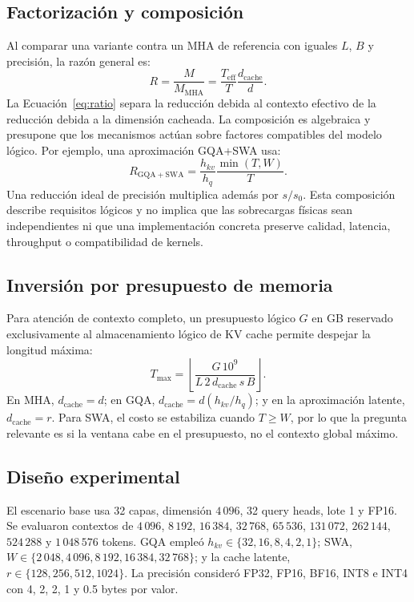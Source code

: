 \documentclass[a4paper,twocolumn]{article}
\begin{document}
\subsection{Factorización y composición}
Al comparar una variante contra un MHA de referencia con iguales $L$, $B$ y precisión, la razón general es:
\begin{equation}\label{eq:ratio}
R=\frac{M}{M_{\mathrm{MHA}}}=\frac{T_{\mathrm{eff}}}{T}\frac{d_{\mathrm{cache}}}{d}.
\end{equation}
La Ecuación~\eqref{eq:ratio} separa la reducción debida al contexto efectivo de la reducción debida a la dimensión cacheada. La composición es algebraica y presupone que los mecanismos actúan sobre factores compatibles del modelo lógico. Por ejemplo, una aproximación GQA+SWA usa:
\begin{equation}\label{eq:compose}
R_{\mathrm{GQA+SWA}}=\frac{h_{kv}}{h_q}\frac{\min(T,W)}{T}.
\end{equation}
Una reducción ideal de precisión multiplica además por $s/s_0$. Esta composición describe requisitos lógicos y no implica que las sobrecargas físicas sean independientes ni que una implementación concreta preserve calidad, latencia, throughput o compatibilidad de kernels.

\subsection{Inversión por presupuesto de memoria}
Para atención de contexto completo, un presupuesto lógico $G$ en GB reservado exclusivamente al almacenamiento lógico de KV cache permite despejar la longitud máxima:
\begin{equation}\label{eq:budget}
T_{\max}=\left\lfloor\frac{G\,10^{9}}{L\,2\,d_{\mathrm{cache}}\,s\,B}\right\rfloor.
\end{equation}
En MHA, $d_{\mathrm{cache}}=d$; en GQA, $d_{\mathrm{cache}}=d(h_{kv}/h_q)$; y en la aproximación latente, $d_{\mathrm{cache}}=r$. Para SWA, el costo se estabiliza cuando $T\ge W$, por lo que la pregunta relevante es si la ventana cabe en el presupuesto, no el contexto global máximo.

\subsection{Diseño experimental}
El escenario base usa 32 capas, dimensión $4\,096$, 32 query heads, lote 1 y FP16. Se evaluaron contextos de $4\,096$, $8\,192$, $16\,384$, $32\,768$, $65\,536$, $131\,072$, $262\,144$, $524\,288$ y $1\,048\,576$ tokens. GQA empleó $h_{kv}\in\{32,16,8,4,2,1\}$; SWA, $W\in\{2\,048,4\,096,8\,192,16\,384,32\,768\}$; y la cache latente, $r\in\{128,256,512,1024\}$. La precisión consideró FP32, FP16, BF16, INT8 e INT4 con 4, 2, 2, 1 y 0.5 bytes por valor.
\end{document}
